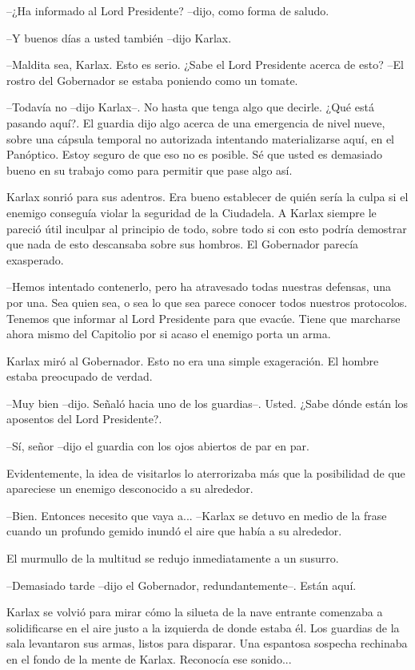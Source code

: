 --¿Ha informado al Lord Presidente? --dijo, como forma de saludo.

--Y buenos días a usted también --dijo Karlax.

--Maldita sea, Karlax. Esto es serio. ¿Sabe el Lord Presidente acerca de esto? --El rostro del Gobernador se estaba poniendo como un tomate.

--Todavía no --dijo Karlax--. No hasta que tenga algo que decirle. ¿Qué está pasando aquí?. El guardia dijo algo acerca de una emergencia de nivel nueve, sobre una cápsula temporal no autorizada intentando materializarse aquí, en el Panóptico. Estoy seguro de que eso no es posible. Sé que usted es demasiado bueno en su trabajo como para permitir que pase algo así.

Karlax sonrió para sus adentros. Era bueno establecer de quién sería la culpa si el enemigo conseguía violar la seguridad de la Ciudadela. A Karlax siempre le pareció útil inculpar al principio de todo, sobre todo si con esto podría demostrar que nada de esto descansaba sobre sus hombros. El Gobernador parecía exasperado. 

--Hemos intentado contenerlo, pero ha atravesado todas nuestras defensas, una por una. Sea quien sea, o sea lo que sea parece conocer todos nuestros protocolos. Tenemos que informar al Lord Presidente para que evacúe. Tiene que marcharse ahora mismo del Capitolio por si acaso el enemigo porta un arma.

Karlax miró al Gobernador. Esto no era una simple exageración. El hombre estaba preocupado de verdad.

--Muy bien --dijo. Señaló hacia uno de los guardias--. Usted. ¿Sabe dónde están los aposentos del Lord Presidente?.

--Sí, señor --dijo el guardia con los ojos abiertos de par en par.

Evidentemente, la idea de visitarlos lo aterrorizaba más que la posibilidad de que apareciese un enemigo desconocido a su alrededor.

--Bien. Entonces necesito que vaya a... --Karlax se detuvo en medio de la frase cuando un profundo gemido inundó el aire que había a su alrededor. 

El murmullo de la multitud se redujo inmediatamente a un susurro.

--Demasiado tarde --dijo el Gobernador, redundantemente--. Están aquí.

Karlax se volvió para mirar cómo la silueta de la nave entrante comenzaba a solidificarse en el aire justo a la izquierda de donde estaba él. Los guardias de la sala levantaron sus armas, listos para disparar. Una espantosa sospecha rechinaba en el fondo de la mente de Karlax. Reconocía ese sonido...

